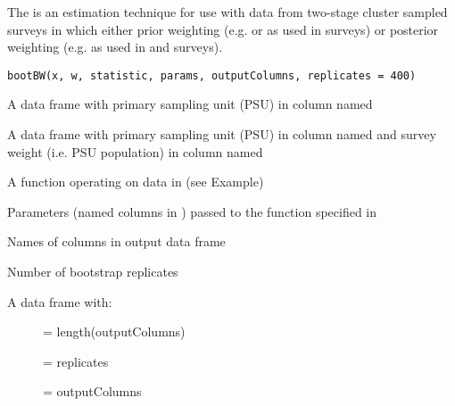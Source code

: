 \documentclass[a4paper]{book}
\begin{document}
%
\begin{Description}\relax
The  is an estimation technique for
use with data from two-stage cluster sampled surveys in which either prior
weighting (e.g.  or  as
used in  surveys) or posterior weighting (e.g. as used in
 and  surveys).
\end{Description}
%
\begin{Usage}
\begin{verbatim}
bootBW(x, w, statistic, params, outputColumns, replicates = 400)
\end{verbatim}
\end{Usage}
%
\begin{Arguments}
\begin{ldescription}
\item[\code{x}] A data frame with primary sampling unit (PSU) in column named 

\item[\code{w}] A data frame with primary sampling unit (PSU) in column named 
and survey weight (i.e. PSU population) in column named 

\item[\code{statistic}] A function operating on data in  (see Example)

\item[\code{params}] Parameters (named columns in ) passed to the function
specified in 

\item[\code{outputColumns}] Names of columns in output data frame

\item[\code{replicates}] Number of bootstrap replicates
\end{ldescription}
\end{Arguments}
%
\begin{Value}
A data frame with:
\begin{description}

\item[]  = length(outputColumns)
\item[]  = replicates
\item[]  = outputColumns

\end{description}

\end{Value}
\end{document}
